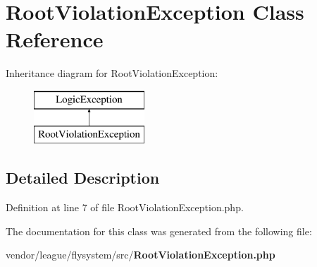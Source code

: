 \section{Root\+Violation\+Exception Class Reference}
\label{class_league_1_1_flysystem_1_1_root_violation_exception}
Inheritance diagram for Root\+Violation\+Exception\+:\begin{figure}[H]
\begin{center}
\leavevmode
\includegraphics[height=2.000000cm]{class_league_1_1_flysystem_1_1_root_violation_exception}
\end{center}
\end{figure}


\subsection{Detailed Description}


Definition at line 7 of file Root\+Violation\+Exception.\+php.



The documentation for this class was generated from the following file\+:\begin{DoxyCompactItemize}
\item 
vendor/league/flysystem/src/{\bf Root\+Violation\+Exception.\+php}\end{DoxyCompactItemize}
